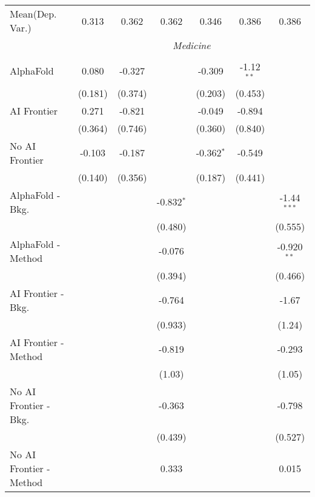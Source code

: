 \begin{tabular}{lcccccc}
Mean(Dep. Var.) & 0.313 & 0.362 & 0.362 & 0.346 & 0.386 & 0.386 \\
 & \multicolumn{6}{c}{\textit{Medicine}} \\ \\
   AlphaFold               & 0.080   & -0.327  &              & -0.309       & -1.12$^{**}$ &   \\   
                           & (0.181) & (0.374) &              & (0.203)      & (0.453)      &   \\   
   AI Frontier             & 0.271   & -0.821  &              & -0.049       & -0.894       &   \\   
                           & (0.364) & (0.746) &              & (0.360)      & (0.840)      &   \\   
   No AI Frontier          & -0.103  & -0.187  &              & -0.362$^{*}$ & -0.549       &   \\   
                           & (0.140) & (0.356) &              & (0.187)      & (0.441)      &   \\   
   AlphaFold - Bkg.        &         &         & -0.832$^{*}$ &              &              & -1.44$^{***}$\\   
                           &         &         & (0.480)      &              &              & (0.555)\\   
   AlphaFold - Method      &         &         & -0.076       &              &              & -0.920$^{**}$\\   
                           &         &         & (0.394)      &              &              & (0.466)\\   
   AI Frontier - Bkg.      &         &         & -0.764       &              &              & -1.67\\   
                           &         &         & (0.933)      &              &              & (1.24)\\   
   AI Frontier - Method    &         &         & -0.819       &              &              & -0.293\\   
                           &         &         & (1.03)       &              &              & (1.05)\\   
   No AI Frontier - Bkg.   &         &         & -0.363       &              &              & -0.798\\   
                           &         &         & (0.439)      &              &              & (0.527)\\   
   No AI Frontier - Method &         &         & 0.333        &              &              & 0.015\\   

\end{tabular}
